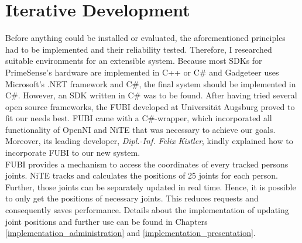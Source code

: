 
\section{Iterative Development}
\label{installation_testing}

Before anything could be installed or evaluated, the aforementioned principles had to be implemented and their reliability tested. Therefore, I researched suitable environments for an extensible system. Because most \ac{SDK}s for PrimeSense's hardware are implemented in C++ or C$\#$ and Gadgeteer uses Microsoft's .NET framework and C$\#$, the final system should be implemented in C$\#$. However, an \ac{SDK} written in C$\#$ was to be found. After having tried several open source frameworks, the \ac{FUBI} developed at Universität Augsburg proved to fit our needs best. \ac{FUBI} came with a C$\#$-wrapper, which incorporated all functionality of OpenNI and NiTE that was necessary to achieve our goals. Moreover, its leading developer, \textit{Dipl.-Inf. Felix Kistler}, kindly explained how to incorporate \ac{FUBI} to our new system. 
\\
\ac{FUBI} provides a mechanism to access the coordinates of every tracked persons joints. NiTE tracks and calculates the positions of 25 joints for each person. Further, those joints can be separately updated in real time. Hence, it is possible to only get the positions of necessary joints. This reduces requests and consequently saves performance. Details about the implementation of updating joint positions and further use can be found in Chapters \ref{implementation_administration} and \ref{implementation_presentation}.

